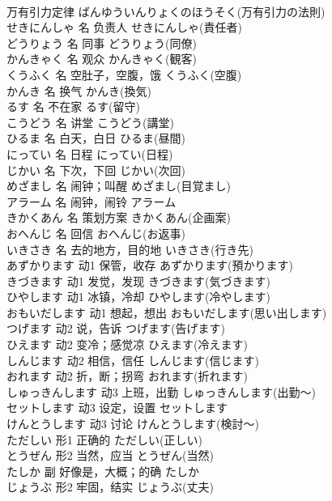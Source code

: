 \documentclass[8pt]{extreport}
\begin{document}
\begin{CJK}{UTF8}{min}
\\	万有引力定律	ばんゆういんりょくのほうそく(万有引力の法則)	
\\	せきにんしゃ	名	负责人	せきにんしゃ(責任者)	
\\	どうりょう	名	同事	どうりょう(同僚)	
\\	かんきゃく	名	观众	かんきゃく(観客)	
\\	くうふく	名	空肚子，空腹，饿	くうふく(空腹)	
\\	かんき	名	换气	かんき(換気)	
\\	るす	名	不在家	るす(留守)	
\\	こうどう	名	讲堂	こうどう(講堂)	
\\	ひるま	名	白天，白日	ひるま(昼間)	
\\	にってい	名	日程	にってい(日程)	
\\	じかい	名	下次，下回	じかい(次回)	
\\	めざまし	名	闹钟；叫醒	めざまし(目覚まし)	
\\	アラーム	名	闹钟，闹铃	アラーム	
\\	きかくあん	名	策划方案	きかくあん(企画案)	
\\	おへんじ	名	回信	おへんじ(お返事)	
\\	いきさき	名	去的地方，目的地	いきさき(行き先)	
\\	あずかります	动1	保管，收存	あずかります(預かります)	
\\	きづきます	动1	发觉，发现	きづきます(気づきます)	
\\	ひやします	动1	冰镇，冷却	ひやします(冷やします)	
\\	おもいだします	动1	想起，想出	おもいだします(思い出します)	
\\	つげます	动2	说，告诉	つげます(告げます)	
\\	ひえます	动2	变冷；感觉凉	ひえます(冷えます)	
\\	しんじます	动2	相信，信任	しんじます(信じます)	
\\	おれます	动2	折，断；拐弯	おれます(折れます)	
\\	しゅっきんします	动3	上班，出勤	しゅっきんします(出勤～)	
\\	セットします	动3	设定，设置	セットします	
\\	けんとうします	动3	讨论	けんとうします(検討～)	
\\	ただしい	形1	正确的	ただしい(正しい)	
\\	とうぜん	形2	当然，应当	とうぜん(当然)	
\\	たしか	副	好像是，大概；的确	たしか	
\\	じょうぶ	形2	牢固，结实	じょうぶ(丈夫)	

\end{CJK}
\end{document}
